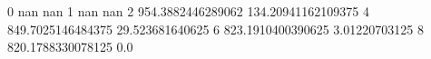 0 nan nan
1 nan nan
2 954.3882446289062 134.20941162109375
4 849.7025146484375 29.523681640625
6 823.1910400390625 3.01220703125
8 820.1788330078125 0.0
